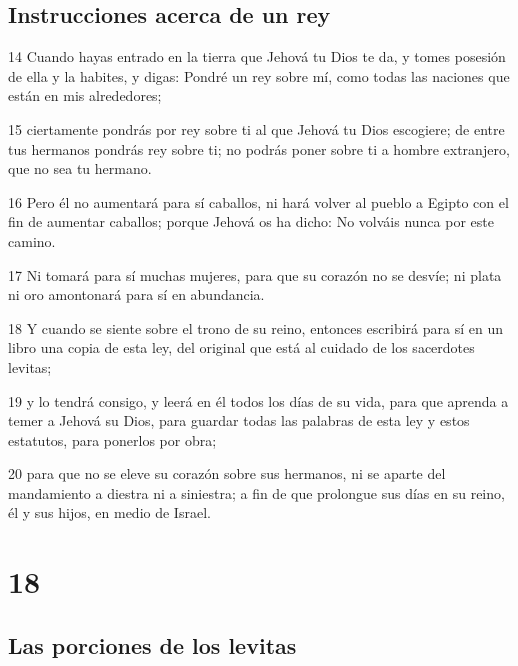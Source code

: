 \section{Instrucciones acerca de un rey}

\par 14 Cuando hayas entrado en la tierra que Jehová tu Dios te da, y tomes posesión de ella y la habites, y digas: Pondré un rey sobre mí, como todas las naciones que están en mis alrededores;
\par 15 ciertamente pondrás por rey sobre ti al que Jehová tu Dios escogiere; de entre tus hermanos pondrás rey sobre ti; no podrás poner sobre ti a hombre extranjero, que no sea tu hermano.
\par 16 Pero él no aumentará para sí caballos, ni hará volver al pueblo a Egipto con el fin de aumentar caballos; porque Jehová os ha dicho: No volváis nunca por este camino.
\par 17 Ni tomará para sí muchas mujeres, para que su corazón no se desvíe; ni plata ni oro amontonará para sí en abundancia. 
\par 18 Y cuando se siente sobre el trono de su reino, entonces escribirá para sí en un libro una copia de esta ley, del original que está al cuidado de los sacerdotes levitas;
\par 19 y lo tendrá consigo, y leerá en él todos los días de su vida, para que aprenda a temer a Jehová su Dios, para guardar todas las palabras de esta ley y estos estatutos, para ponerlos por obra;
\par 20 para que no se eleve su corazón sobre sus hermanos, ni se aparte del mandamiento a diestra ni a siniestra; a fin de que prolongue sus días en su reino, él y sus hijos, en medio de Israel. 


\chapter{18}

\section{Las porciones de los levitas}

